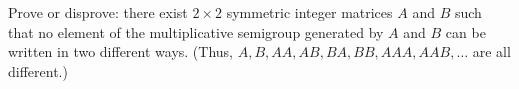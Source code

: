 \begin{problem}
    Prove or disprove: there exist \( 2 \times 2 \) symmetric integer matrices \( A \) and \( B \) such that no element of the multiplicative semigroup generated by \( A \) and \( B \) can be written in two different ways. (Thus, \( A, B, AA, AB, BA, BB, AAA, AAB, \ldots \) are all different.)
\end{problem}

